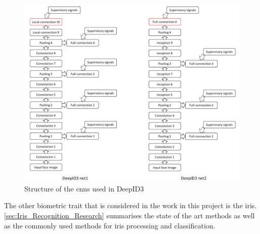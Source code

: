 \begin{figure}[h]
	\centering
	\includegraphics[width=\textwidth]{figures/deepid3_net}
	\caption{Structure of the \gls{cnn}s used in DeepID3 \citep{sun2015}}
	\label{fig:deepid3_net}
\end{figure}

The other biometric trait that is considered in the work in this project is the iris. \autoref{sec:Iris_Recognition_Research} summarises the state of the art methods as well as the commonly used methods for iris processing and classification.  